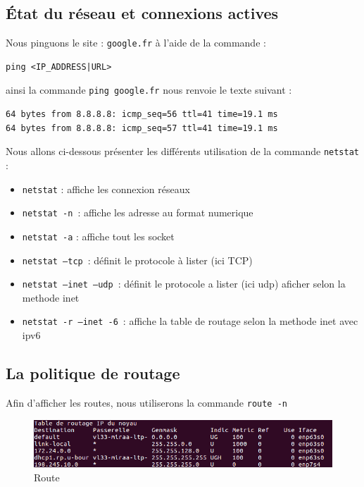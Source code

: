 \subsection{État du réseau et connexions actives}
Nous pinguons le site : \texttt{google.fr} à l'aide de la commande :
\begin{verbatim}
ping <IP_ADDRESS|URL>
\end{verbatim}

ainsi la commande \texttt{ping google.fr} nous renvoie le texte suivant :
\begin{verbatim}
64 bytes from 8.8.8.8: icmp_seq=56 ttl=41 time=19.1 ms
64 bytes from 8.8.8.8: icmp_seq=57 ttl=41 time=19.1 ms
\end{verbatim}
Nous allons ci-dessous présenter les différents utilisation de la commande \texttt{netstat} :
\begin{itemize}
  \item  \texttt{netstat} : affiche les connexion réseaux
  \item  \texttt{netstat -n} : affiche les adresse au format numerique
  \item  \texttt{netstat -a} : affiche tout les socket
  \item  \texttt{netstat  --tcp} : définit le protocole à lister (ici TCP)
  \item  \texttt{netstat --inet --udp} : définit le protocole a lister (ici udp) aficher selon la methode inet
  \item  \texttt{netstat -r --inet -6} : affiche la table de routage selon la methode inet avec ipv6
\end{itemize}

\subsection{La politique de routage}
Afin d'afficher les routes, nous utiliserons la commande \texttt{route -n}

\begin{figure}[H]
\centering
\includegraphics[width=400pt]{./TP1/Pictures/route}
\caption{Route}
\label{Route}
\end{figure}

